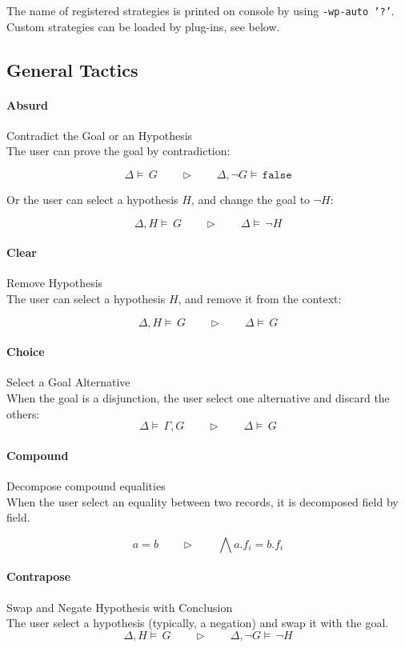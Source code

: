 The name of registered strategies is printed on console by using \texttt{-wp-auto '?'}. Custom strategies can be loaded by plug-ins, see below.

\newcommand{\TACTIC}[2]{#1\quad\quad\triangleright\quad\quad#2}

\subsection{General Tactics}

\paragraph{Absurd} Contradict the Goal or an Hypothesis\\
The user can prove the goal by contradiction:

$$ \TACTIC{\Delta\models\,G}{\Delta,\neg G\models\,\mathtt{false}} $$

Or the user can select a hypothesis $H$, and change the goal to $\neg H$:

$$ \TACTIC{\Delta,H\models\,G}{\Delta\models\,\neg H} $$

\paragraph{Clear} Remove Hypothesis\\
The user can select a hypothesis $H$, and remove it from the context:

$$ \TACTIC{\Delta,H\models\,G}{\Delta\models\,G} $$

\paragraph{Choice} Select a Goal Alternative\\
When the goal is a disjunction, the user select one alternative and discard the others:
$$ \TACTIC{\Delta\models\,\Gamma,G}{\Delta\models\,G} $$

\paragraph{Compound} Decompose compound equalities\\
When the user select an equality between two records, it is decomposed field by field.

$$ \TACTIC{ a = b }{ \bigwedge a.f_i = b.f_i } $$

\paragraph{Contrapose} Swap and Negate Hypothesis with Conclusion\\
The user select a hypothesis (typically, a negation) and swap it with the goal.
$$ \TACTIC{\Delta,H\models\,G}{\Delta,\neg G\models\,\neg H} $$

